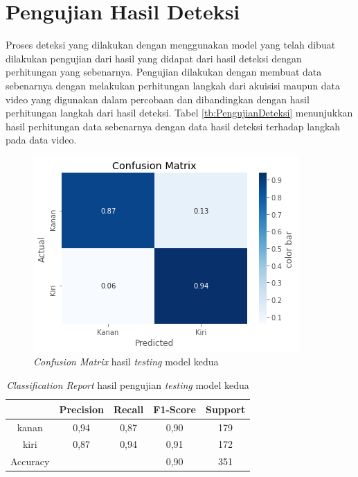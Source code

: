 \section{Pengujian Hasil Deteksi}
\label{sec:PengujianDeteksi}

Proses deteksi yang dilakukan dengan menggunakan model yang telah dibuat dilakukan pengujian dari hasil yang didapat dari hasil deteksi dengan perhitungan yang sebenarnya. Pengujian dilakukan dengan membuat data sebenarnya dengan melakukan perhitungan langkah dari akuisisi maupun data video yang digunakan dalam percobaan dan dibandingkan dengan hasil perhitungan langkah dari hasil deteksi. Tabel \ref{tb:PengujianDeteksi} menunjukkan hasil perhitungan data sebenarnya dengan data hasil deteksi terhadap langkah pada data video. 

\begin{figure}[H]
  \centering
  \includegraphics[scale=0.75]{gambar/cm model belakang.png}
  \caption{\emph{Confusion Matrix} hasil \emph{testing} model kedua}
  \label{fig:HasilTestingModel2}
\end{figure}


\begin{longtable}{|c|c|c|c|c|}
  \caption{\emph{Classification Report} hasil pengujian \emph{testing} model kedua}
  \label{tb:ClassificationReportModel2}                                   \\
  \hline
  \rowcolor[HTML]{C0C0C0}
   & \textbf{Precision} & \textbf{Recall} & \textbf{F1-Score} & \textbf{Support} \\
  \hline
  kanan     & 0,94    & 0,87    & 0,90    & 179         \\
  \hline
  kiri      & 0,87    & 0,94    & 0,91    & 172           \\
  \hline
  Accuracy  &         &         & 0,90    & 351            \\
  \hline
\end{longtable}


